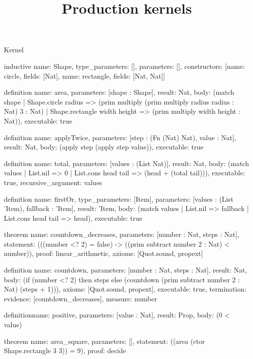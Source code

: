 \begin{lexlean}{Kernel}
\title{Production kernels}
\begin{semanticmodule}
inductive{
  name: Shape,
  type_parameters: [],
  parameters: [],
  constructors: [{name: circle, fields: [Nat]}, {name: rectangle, fields: [Nat, Nat]}]
}

definition{
  name: area,
  parameters: [shape : Shape],
  result: Nat,
  body: (match shape
    | Shape.circle radius => (prim multiply (prim multiply radius radius : Nat) 3 : Nat)
    | Shape.rectangle width height => (prim multiply width height : Nat)),
  executable: true
}

definition{
  name: applyTwice,
  parameters: [step : (Fn (Nat) Nat), value : Nat],
  result: Nat,
  body: (apply step (apply step value)),
  executable: true
}

definition{
  name: total,
  parameters: [values : (List Nat)],
  result: Nat,
  body: (match values | List.nil => 0 | List.cons head tail => (head + (total tail))),
  executable: true,
  recursive_argument: values
}

definition{
  name: firstOr,
  type_parameters: [Item],
  parameters: [values : (List 'Item), fallback : 'Item],
  result: 'Item,
  body: (match values | List.nil => fallback | List.cons head tail => head),
  executable: true
}

theorem{
  name: countdown_decreases,
  parameters: [number : Nat, steps : Nat],
  statement: (((number <? 2) = false) -> ((prim subtract number 2 : Nat) < number)),
  proof: linear_arithmetic{},
  axioms: [Quot.sound, propext]
}

definition{
  name: countdown,
  parameters: [number : Nat, steps : Nat],
  result: Nat,
  body: (if (number <? 2) then steps else (countdown (prim subtract number 2 : Nat) (steps + 1))),
  axioms: [Quot.sound, propext],
  executable: true,
  termination: {evidence: [countdown_decreases], measure: number}
}

definition{name: positive, parameters: [value : Nat], result: Prop, body: (0 < value)}

theorem{
  name: area_square,
  parameters: [],
  statement: ((area (ctor Shape.rectangle 3 3)) = 9),
  proof: decide{}
}
\end{semanticmodule}
\end{lexlean}
